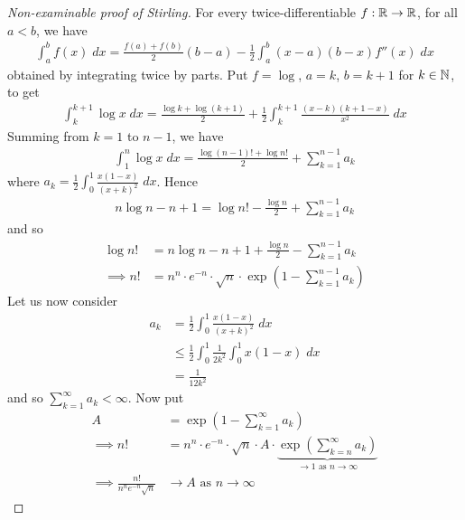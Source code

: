 \documentclass{../template/note}
\begin{document}
    \begin{proof}[Non-examinable proof of Stirling]
        For every twice-differentiable \(f: \mathbb R \to \mathbb R\), for all \(a < b\), we have
        \begin{align*}
            \int_a^b f(x) \; dx = \frac{f(a) + f(b)}{2}(b-a) - \frac{1}{2} \int_a^b (x-a)(b-x)f''(x) \; dx
        \end{align*}
        obtained by integrating twice by parts. Put \(f = \log\), \(a = k\), \(b = k+1\) for \(k \in \mathbb N\), to get
        \begin{align*}
            \int_k^{k+1} \log x \; dx = \frac{\log k + \log(k+1)}{2} + \frac{1}{2} \int_{k}^{k+1} \frac{(x-k)(k+1-x)}{x^2} \; dx
        \end{align*}
        Summing from \(k=1\) to \(n-1\), we have
        \begin{align*}
            \int_1^n \log x \; dx = \frac{\log(n-1)! + \log n!}{2} + \sum_{k=1}^{n-1} a_k
        \end{align*}
        where \(a_k = \frac 1 2 \int_0^1 \frac{x(1-x)}{(x+k)^2} \; dx\). Hence
        \begin{align*}
            n \log n - n + 1 = \log n! - \frac{\log n}{2} + \sum_{k=1}^{n-1} a_k
        \end{align*}
        and so
        \begin{align*}
            \log n! &= n \log n - n + 1 + \frac{\log n}{2} - \sum_{k=1}^{n-1} a_k \\
            \implies n! &= n^n \cdot e^{-n} \cdot \sqrt{n} \cdot \exp\left(1-\sum_{k=1}^{n-1} a_k\right)
        \end{align*}
        Let us now consider
        \begin{align*}
            a_k &= \frac{1}{2} \int_0^1 \frac{x(1-x)}{(x+k)^2} \; dx \\
            &\leq \frac{1}{2} \int_0^1 \frac{1}{2k^2} \int_0^1 x(1-x) \; dx \\
            &= \frac{1}{12k^2}
        \end{align*}
        and so \(\sum_{k=1}^\infty a_k < \infty\). Now put
        \begin{align*}
            A &= \exp\left(1 - \sum_{k=1}^\infty a_k\right) \\
            \implies n! &= n^n \cdot e^{-n} \cdot \sqrt{n} \cdot A \cdot \underbrace{\exp\left(\sum_{k=n}^\infty a_k\right)}_{\to 1 \text{ as } n \to \infty} \\
            \implies \frac{n!}{n^ne^{-n}\sqrt{n}} &\to A \text{ as } n \to \infty

\end{align*}
\end{proof}
\end{document}
